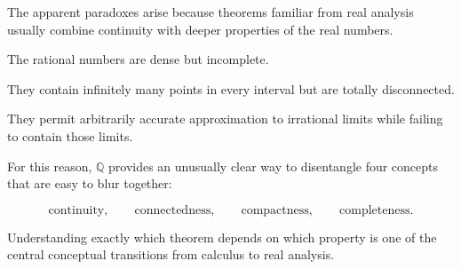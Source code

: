 \documentclass{essay}
\begin{document}
The apparent paradoxes arise because theorems familiar from real analysis
usually combine continuity with deeper properties of the real numbers.

The rational numbers are dense but incomplete.

They contain infinitely many points in every interval but are totally
disconnected.

They permit arbitrarily accurate approximation to irrational limits while
failing to contain those limits.

For this reason, \(\mathbb{Q}\) provides an unusually clear way to disentangle
four concepts that are easy to blur together:

\[ \boxed{ \text{continuity}, \qquad \text{connectedness}, \qquad \text{compactness}, \qquad \text{completeness}. } \]

Understanding exactly which theorem depends on which property is one of the
central conceptual transitions from calculus to real analysis.
\end{document}
